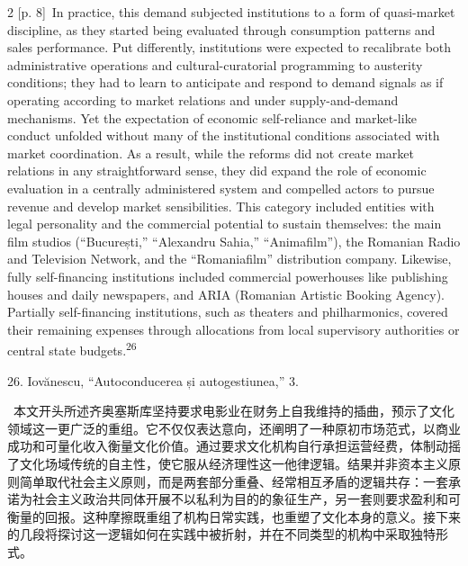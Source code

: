 \documentclass[10pt,a4paper]{article}
\begin{document}
\begin{paracol}{2}
{\scriptsize\color{gray} [p. 8]}\ In practice, this demand subjected institutions to a form of quasi-market discipline, as they started being evaluated through consumption patterns and sales performance. Put differently, institutions were expected to recalibrate both administrative operations and cultural-curatorial programming to austerity conditions; they had to learn to anticipate and respond to demand signals as if operating according to market relations and under supply-and-demand mechanisms. Yet the expectation of economic self-reliance and market-like conduct unfolded without many of the institutional conditions associated with market coordination. As a result, while the reforms did not create market relations in any straightforward sense, they did expand the role of economic evaluation in a centrally administered system and compelled actors to pursue revenue and develop market sensibilities. This category included entities with legal personality and the commercial potential to sustain themselves: the main film studios (“București,” “Alexandru Sahia,” “Animafilm”), the Romanian Radio and Television Network, and the “Romaniafilm” distribution company. Likewise, fully self-financing institutions included commercial powerhouses like publishing houses and daily newspapers, and ARIA (Romanian Artistic Booking Agency). Partially self-financing institutions, such as theaters and philharmonics, covered their remaining expenses through allocations from local supervisory authorities or central state budgets.\nobreak\textsuperscript{26}\par{\small 26. Iovănescu, “Autoconducerea și autogestiunea,” 3.\par}
\switchcolumn*
{\scriptsize\color{gray} [p. 9]}\ 本文开头所述齐奥塞斯库坚持要求电影业在财务上自我维持的插曲，预示了文化领域这一更广泛的重组。它不仅仅表达意向，还阐明了一种原初市场范式，以商业成功和可量化收入衡量文化价值。通过要求文化机构自行承担运营经费，体制动摇了文化场域传统的自主性，使它服从经济理性这一他律逻辑。结果并非资本主义原则简单取代社会主义原则，而是两套部分重叠、经常相互矛盾的逻辑共存：一套承诺为社会主义政治共同体开展不以私利为目的的象征生产，另一套则要求盈利和可衡量的回报。这种摩擦既重组了机构日常实践，也重塑了文化本身的意义。接下来的几段将探讨这一逻辑如何在实践中被折射，并在不同类型的机构中采取独特形式。\par
\switchcolumn

\end{paracol}
\end{document}
